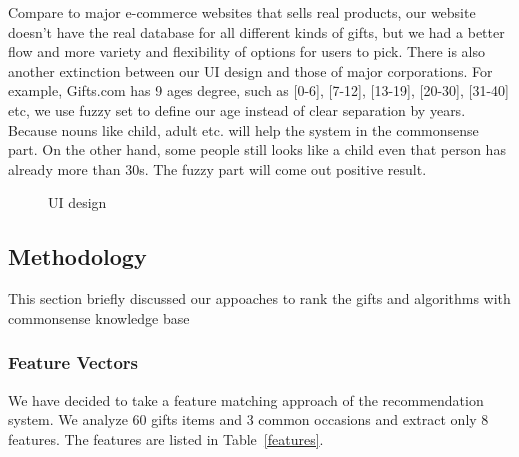 \documentclass[11pt,twocolumn]{article}
\begin{document}
Compare to major e-commerce websites that sells real products, our website doesn't have the real database for all different kinds of gifts, but we had a better flow and more variety and flexibility of options for users to pick. There is also another extinction between our UI design and those of major corporations. For example, Gifts.com has 9 ages degree, such as [0-6], [7-12], [13-19], [20-30], [31-40] etc, we use fuzzy set to define our age instead of clear separation by years. Because nouns like child, adult etc. will help the system in the commonsense part.  On the other hand, some people still looks like a child even that person has already more than 30s.  The fuzzy part will come out positive result.




\begin{figure}[h!t]
\caption{UI design}
\label{ui}
\end{figure}

\subsection{Methodology}

This section briefly discussed our appoaches to rank the gifts and algorithms with commonsense knowledge base

\subsubsection{Feature Vectors}

We have decided to take a feature matching approach of the recommendation system.
We analyze 60 gifts items and 3 common occasions and extract only 8 features.  
The features are listed in Table~\ref{features}.
\end{document}
